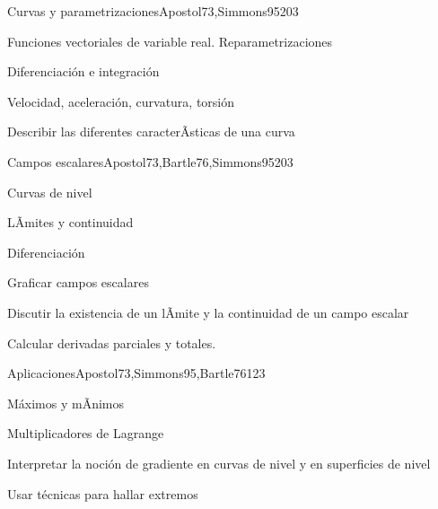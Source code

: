 \begin{syllabus}
\begin{unit}{Curvas y parametrizaciones}{Apostol73,Simmons95}{20}{3}
   \begin{topics}
      \item Funciones vectoriales de variable real. Reparametrizaciones
      \item Diferenciación e integración
      \item Velocidad, aceleración, curvatura, torsión
      \end{topics}

   \begin{learningoutcomes}
      \item Describir las diferentes caracterÃ­sticas de una curva
      \end{learningoutcomes}
\end{unit}

\begin{unit}{Campos escalares}{Apostol73,Bartle76,Simmons95}{20}{3}
   \begin{topics}
      \item Curvas de nivel
      \item LÃ­mites y continuidad
      \item Diferenciación
      \end{topics}

   \begin{learningoutcomes}
      \item Graficar campos escalares
      \item Discutir la existencia de un lÃ­mite y la continuidad de un campo escalar
      \item Calcular derivadas parciales y totales.
      \end{learningoutcomes}
\end{unit}

\begin{unit}{Aplicaciones}{Apostol73,Simmons95,Bartle76}{12}{3}
   \begin{topics}
      \item Máximos y mÃ­nimos
      \item Multiplicadores de Lagrange
      \end{topics}

   \begin{learningoutcomes}
      \item Interpretar la noción de gradiente en curvas de nivel y en superficies de nivel
      \item Usar técnicas para hallar extremos
      \end{learningoutcomes}
\end{unit}


\end{syllabus}
